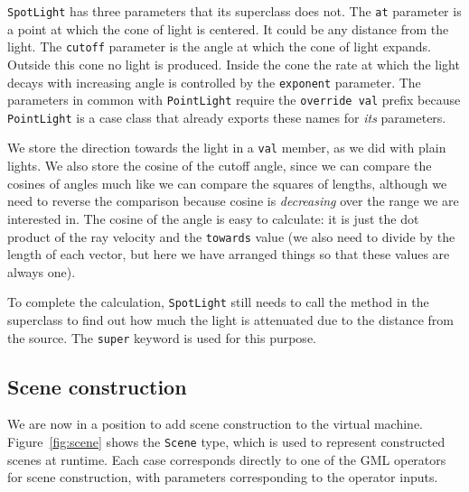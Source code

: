 \verb!SpotLight! has three parameters that its superclass does not.
The \verb!at! parameter is a point at which the cone of light is centered.
It could be any distance from the light.
The \verb!cutoff! parameter is the angle at which the cone of light expands.
Outside this cone no light is produced.
Inside the cone the rate at which the light decays with increasing angle
is controlled by the \verb!exponent! parameter.
The parameters in common with \verb!PointLight!
require the \verb!override val! prefix
because \verb!PointLight! is a case class
that already exports these names for \emph{its} parameters.

We store the direction towards the light in a \verb!val! member,
as we did with plain lights.
We also store the cosine of the cutoff angle,
since we can compare the cosines of angles much like we can compare
the squares of lengths,
although we need to reverse the comparison because
cosine is \emph{decreasing} over the range we are interested in.
The cosine of the angle is easy to calculate:
it is just the dot product of the ray velocity and the \verb!towards! value
(we also need to divide by the length of each vector,
but here we have arranged things so that these values are always one).

To complete the calculation,
\verb!SpotLight! still needs to call the method in the superclass
to find out how much the light is attenuated
due to the distance from the source.
The \verb!super! keyword is used for this purpose.


\subsection{Scene construction\label{sec:scene}}

We are now in a position to add scene construction to the virtual machine.
Figure~\ref{fig:scene} shows the \verb!Scene! type,
which is used to represent constructed scenes at runtime.
Each case corresponds directly to
one of the GML operators for scene construction,
with parameters corresponding to the operator inputs.

